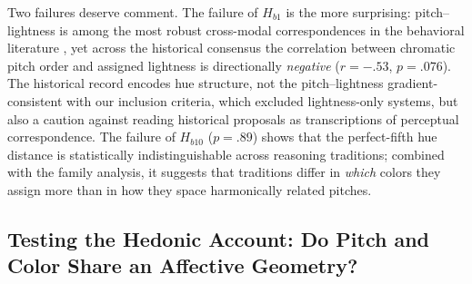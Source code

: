 \documentclass[12pt]{article}
\begin{document}
Two failures deserve comment. The failure of $H_{b1}$ is the more
surprising: pitch--lightness is among the most robust cross-modal
correspondences in the behavioral literature
\citep{marks1978,ward2006}, yet across the historical consensus the
correlation between chromatic pitch order and assigned lightness is
directionally \emph{negative} ($r = -.53$, $p = .076$). The historical
record encodes hue structure, not the pitch--lightness gradient-%
consistent with our inclusion criteria, which excluded
lightness-only systems, but also a caution against reading historical
proposals as transcriptions of perceptual correspondence. The failure
of $H_{b10}$ ($p = .89$) shows that the perfect-fifth hue distance is
statistically indistinguishable across reasoning traditions; combined
with the family analysis, it suggests that traditions differ in
\emph{which} colors they assign more than in how they space
harmonically related pitches.

\subsection{Testing the Hedonic Account: Do Pitch and Color Share an
Affective Geometry?}
\end{document}
